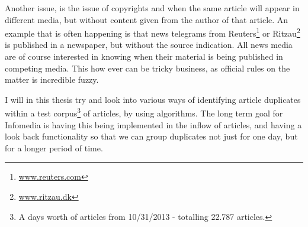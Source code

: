 Another issue, is the issue of copyrights and when the same article will appear in different media, but without content given from the author of that article. An example that is often happening is that news telegrams from Reuters\footnote{\url{www.reuters.com}} or Ritzau\footnote{\url{www.ritzau.dk}} is published in a newspaper, but without the source indication. All news media are of course interested in knowing when their material is being published in competing media. This how ever can be tricky business, as official rules on the matter is incredible fuzzy.

I will in this thesis try and look into various ways of identifying article duplicates within a test corpus\footnote{A days worth of articles from 10/31/2013 - totalling 22.787 articles.} of articles, by using algorithms. The long term goal for Infomedia is having this being implemented in the inflow of articles, and having a look back functionality so that we can group duplicates not just for one day, but for a longer period of time. 
